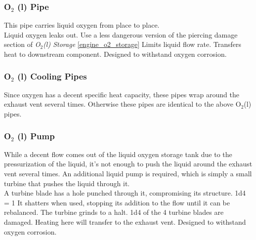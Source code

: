 \documentclass[a4paper]{article}
\begin{document}
\vspace{-0.5cm} \hspace{-18pt} \subsubsection{O$_2$ (l) Pipe} \label{engine_o2_pipe} \vspace{-0.2cm}
This pipe carries liquid oxygen from place to place. 
\\ \pbhw
{Liquid oxygen leaks out. Use a less dangerous version of the piercing damage section of \textit{O$_2$(l) Storage} \ref{engine_o2_storage}}
{Limits liquid flow rate.}
{Transfers heat to downstream component.}
{Designed to withstand oxygen corrosion.}


\vspace{-0.5cm} \hspace{-18pt} \subsubsection{O$_2$ (l) Cooling Pipes} \label{engine_o2_cooling} \vspace{-0.2cm}
Since oxygen has a decent specific heat capacity, these pipes wrap around the exhaust vent several times. Otherwise these pipes are identical to the above O$_2$(l) pipes.

\vspace{-0.5cm} \hspace{-18pt} \subsubsection{O$_2$ (l) Pump} \label{engine_o2_pump} \vspace{-0.2cm}
While a decent flow comes out of the liquid oxygen storage tank due to the pressurization of the liquid, it's not enough to push the liquid around the exhaust vent several times. An additional liquid pump is required, which is simply a small turbine that pushes the liquid through it.
\\ \pbhw
{A turbine blade has a hole punched through it, compromising its structure. \newline 1d4 = 1 It shatters when used, stopping its addition to the flow until it can be rebalanced.}
{The turbine grinds to a halt. 1d4 of the 4 turbine blades are damaged.}
{Heating here will transfer to the exhaust vent.}
{Designed to withstand oxygen corrosion.}
\end{document}
